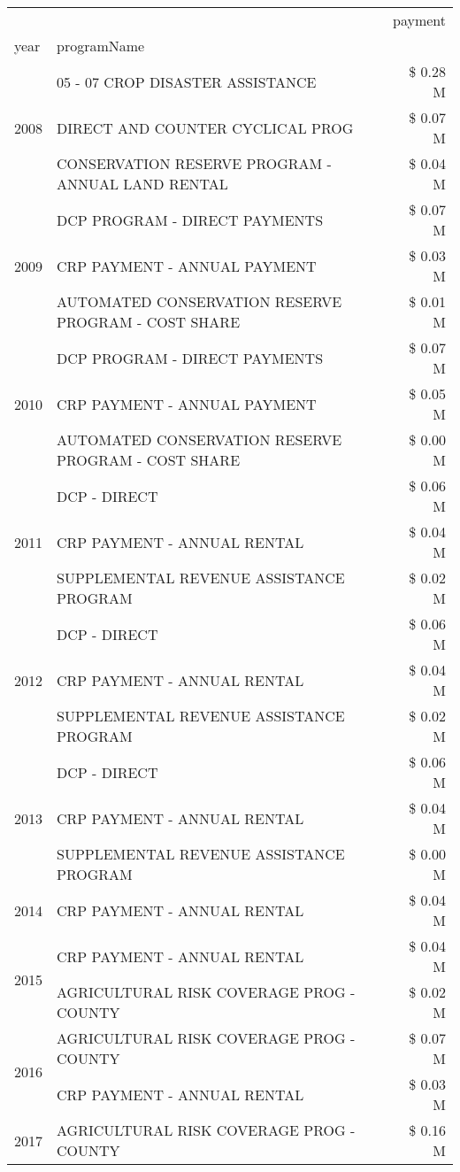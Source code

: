 \begin{tabular}{llr}
\toprule
 &  & payment \\
year & programName &  \\
\midrule
\multirow[t]{3}{*}{2008} & 05 - 07 CROP DISASTER ASSISTANCE & \$ 0.28 M \\
 & DIRECT AND COUNTER CYCLICAL PROG & \$ 0.07 M \\
 & CONSERVATION RESERVE PROGRAM - ANNUAL LAND RENTAL & \$ 0.04 M \\
\cline{1-3}
\multirow[t]{3}{*}{2009} & DCP PROGRAM - DIRECT PAYMENTS & \$ 0.07 M \\
 & CRP PAYMENT - ANNUAL PAYMENT & \$ 0.03 M \\
 & AUTOMATED CONSERVATION RESERVE PROGRAM - COST SHARE & \$ 0.01 M \\
\cline{1-3}
\multirow[t]{3}{*}{2010} & DCP PROGRAM - DIRECT PAYMENTS & \$ 0.07 M \\
 & CRP PAYMENT - ANNUAL PAYMENT & \$ 0.05 M \\
 & AUTOMATED CONSERVATION RESERVE PROGRAM - COST SHARE & \$ 0.00 M \\
\cline{1-3}
\multirow[t]{3}{*}{2011} & DCP - DIRECT & \$ 0.06 M \\
 & CRP PAYMENT - ANNUAL RENTAL & \$ 0.04 M \\
 & SUPPLEMENTAL REVENUE ASSISTANCE PROGRAM & \$ 0.02 M \\
\cline{1-3}
\multirow[t]{3}{*}{2012} & DCP - DIRECT & \$ 0.06 M \\
 & CRP PAYMENT - ANNUAL RENTAL & \$ 0.04 M \\
 & SUPPLEMENTAL REVENUE ASSISTANCE PROGRAM & \$ 0.02 M \\
\cline{1-3}
\multirow[t]{3}{*}{2013} & DCP - DIRECT & \$ 0.06 M \\
 & CRP PAYMENT - ANNUAL RENTAL & \$ 0.04 M \\
 & SUPPLEMENTAL REVENUE ASSISTANCE PROGRAM & \$ 0.00 M \\
\cline{1-3}
2014 & CRP PAYMENT - ANNUAL RENTAL & \$ 0.04 M \\
\cline{1-3}
\multirow[t]{2}{*}{2015} & CRP PAYMENT - ANNUAL RENTAL & \$ 0.04 M \\
 & AGRICULTURAL RISK COVERAGE PROG - COUNTY & \$ 0.02 M \\
\cline{1-3}
\multirow[t]{2}{*}{2016} & AGRICULTURAL RISK COVERAGE PROG - COUNTY & \$ 0.07 M \\
 & CRP PAYMENT - ANNUAL RENTAL & \$ 0.03 M \\
\cline{1-3}
\multirow[t]{3}{*}{2017} & AGRICULTURAL RISK COVERAGE PROG - COUNTY & \$ 0.16 M \\

\end{tabular}
